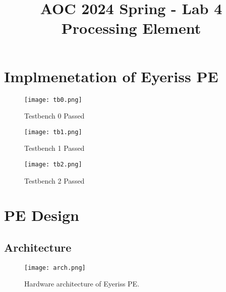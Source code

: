 \documentclass[12pt]{article}
\title{\Large AOC 2024 Spring - Lab 4 Processing Element}
\begin{document}
\maketitle

\section{Implmenetation of Eyeriss PE}

\begin{figure}[h]
    \centering
    \texttt{[image: tb0.png]}
    \caption{Testbench 0 Passed}
\end{figure}

\begin{figure}[h]
    \centering
    \texttt{[image: tb1.png]}
    \caption{Testbench 1 Passed}
\end{figure}

\begin{figure}[h]
    \centering
    \texttt{[image: tb2.png]}
    \caption{Testbench 2 Passed}
\end{figure}

\section{PE Design}

\subsection*{Architecture}
\begin{figure}[h]
    \centering
    \texttt{[image: arch.png]}
    \caption{Hardware architecture of Eyeriss PE.}
    \label{fig:arch}
\end{figure}
\end{document}
